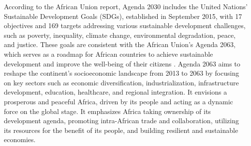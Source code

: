 \documentclass[final,5p,times, twocolumn, sort&compress, sc]{elsarticle}
\begin{document}
According to the African Union report, Agenda 2030 includes the United Nations' Sustainable Development Goals (SDGs), established in September 2015, with 17 objectives and 169 targets addressing various sustainable development challenges, such as poverty, inequality, climate change, environmental degradation, peace, and justice. These goals are consistent with the African Union's Agenda 2063, which serves as a roadmap for African countries to achieve sustainable development and improve the well-being of their citizens \cite{kabachinski2010laptops}. Agenda 2063 aims to reshape the continent's socioeconomic landscape from 2013 to 2063 by focusing on key sectors such as economic diversification, industrialization, infrastructure development, education, healthcare, and regional integration. It envisions a prosperous and peaceful Africa, driven by its people and acting as a dynamic force on the global stage. It emphasizes Africa taking ownership of its development agenda, promoting intra-African trade and collaboration, utilizing its resources for the benefit of its people, and building resilient and sustainable economies.
\end{document}
